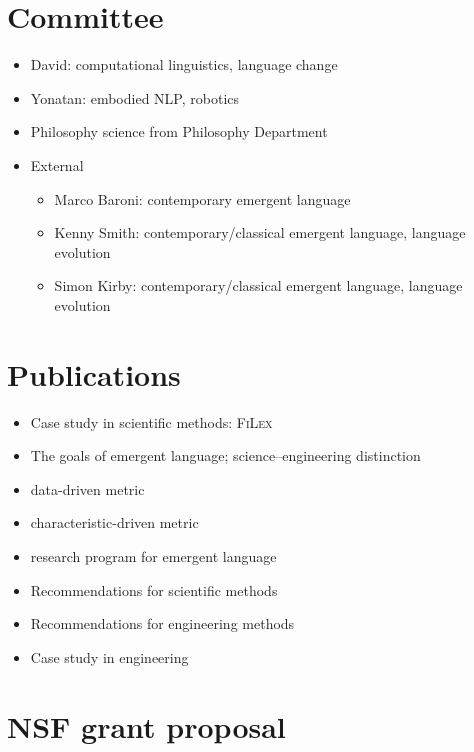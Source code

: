 \section{Committee}
\begin{itemize}
    \item David: computational linguistics, language change
    \item Yonatan: embodied NLP, robotics
    \item {} Philosophy science from Philosophy Department
    \item {} External
        \begin{itemize}
        \item Marco Baroni: contemporary emergent language
        \item Kenny Smith: contemporary/classical emergent language, language evolution
        \item Simon Kirby: contemporary/classical emergent language, language evolution
        \end{itemize}
\end{itemize}

\section{Publications}
\begin{itemize}
    \item{}  Case study in scientific methods: \textsc{FiLex}
    \item{}  The goals of emergent language; science--engineering distinction
    \item{}   data-driven metric
    \item{}   characteristic-driven metric
    \item{}  research program for emergent language
    \item{}  Recommendations for scientific methods
    \item{}  Recommendations for engineering methods
    \item{}   Case study in engineering
\end{itemize}

\section{NSF grant proposal}

